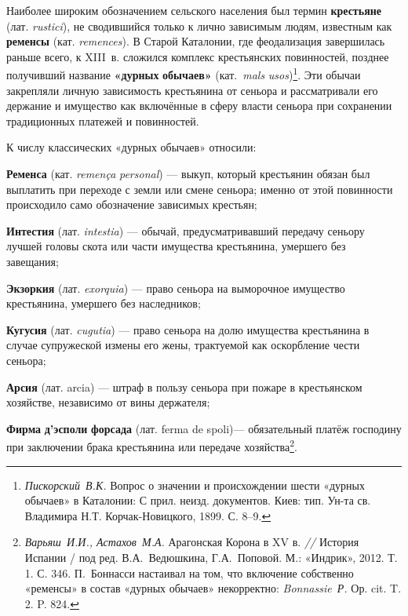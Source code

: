 Наиболее широким обозначением сельского населения был термин \textbf{крестьяне} (лат. \emph{rustici}), не сводившийся только к лично зависимым людям, известным как \textbf{ременсы} (кат. \emph{remences}). В Старой Каталонии, где феодализация завершилась раньше всего, к XIII~в. сложился комплекс крестьянских повинностей, позднее получивший название \textbf{«дурны}\textbf{х}\textbf{ обыча}\textbf{ев}\textbf{»} (кат.~\emph{mals}\emph{ }\emph{usos})\footnote{\emph{Пискорский}\emph{~}\emph{В.К.} Вопрос о значении и происхождении шести «дурных обычаев» в Каталонии: С прил. неизд. документов. Киев: тип. Ун-та св. Владимира Н.Т. Корчак-Новицкого, 1899. С. 8--9.}. Эти обычаи закрепляли личную зависимость крестьянина от сеньора и рассматривали его держание и имущество как включённые в сферу власти сеньора при сохранении традиционных платежей и повинностей.

К числу классических «дурных обычаев» относили:

\textbf{Ременса} (кат. \emph{remen}\emph{ç}\emph{a}\emph{ }\emph{personal}) --- выкуп, который крестьянин обязан был выплатить при переходе с земли или смене сеньора; именно от этой повинности происходило само обозначение зависимых крестьян;

\textbf{Интестия} (лат. \emph{intestia}) --- обычай, предусматривавший передачу сеньору лучшей головы скота или части имущества крестьянина, умершего без завещания;

\textbf{Экзоркия} (лат. \emph{exorquia}) --- право сеньора на выморочное имущество крестьянина, умершего без наследников;

\textbf{Кугусия} (лат. \emph{cugutia}) --- право сеньора на долю имущества крестьянина в случае супружеской измены его жены, трактуемой как оскорбление чести сеньора;

\textbf{Арсия} (лат. arcia) --- штраф в пользу сеньора при пожаре в крестьянском хозяйстве, независимо от вины держателя;

\textbf{Фирма }\textbf{д’эсполи}\textbf{ }\textbf{форсада} (лат. ferma de spoli)--- обязательный платёж господину при заключении брака крестьянина или передаче хозяйства\footnote{\emph{Варьяш}\emph{~}\emph{И.И., Астахов}\emph{~}\emph{М.А.} Арагонская Корона в XV в. \emph{// }История Испании / под ред. В.А.~Ведюшкина, Г.А.~Поповой. М.: «Индрик», 2012. Т. 1. С. 346. П.~Боннасси настаивал на том, что включение собственно «ременсы» в состав «дурных обычаев» некорректно: \emph{Bonnassie}\emph{~}\emph{Р. }Ор. cit. T. 2. P. 824.}.

